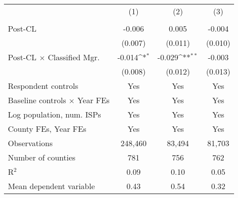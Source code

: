 {
\def\sym#1{\ifmmode^{#1}\else\(^{#1}\)\fi}
\begin{tabular}{l*{3}{c}}
\toprule
                    &&&\\
                    &&&\\
\midrule
Post-CL             &      -0.006         &       0.005         &      -0.004         \\
                    &     (0.007)         &     (0.011)         &     (0.010)         \\
\addlinespace
Post-CL $\times$ Classified Mgr.&      -0.014\sym{*}  &      -0.029\sym{**} &      -0.003         \\
                    &     (0.008)         &     (0.012)         &     (0.013)         \\
\addlinespace
Respondent controls &         Yes         &         Yes         &         Yes         \\
\addlinespace
Baseline controls $\times$ Year FEs &         Yes         &         Yes         &         Yes         \\
\addlinespace
Log population, num. ISPs  &         Yes         &         Yes         &         Yes         \\
\addlinespace
County FEs, Year FEs &         Yes         &         Yes         &         Yes         \\
\midrule
Observations        &     248,460         &      83,494         &      81,703         \\
Number of counties  &         781         &         756         &         762         \\
R$^2$               &        0.09         &        0.10         &        0.05         \\
Mean dependent variable&        0.43         &        0.54         &        0.32         \\
\bottomrule
\end{tabular}
}
